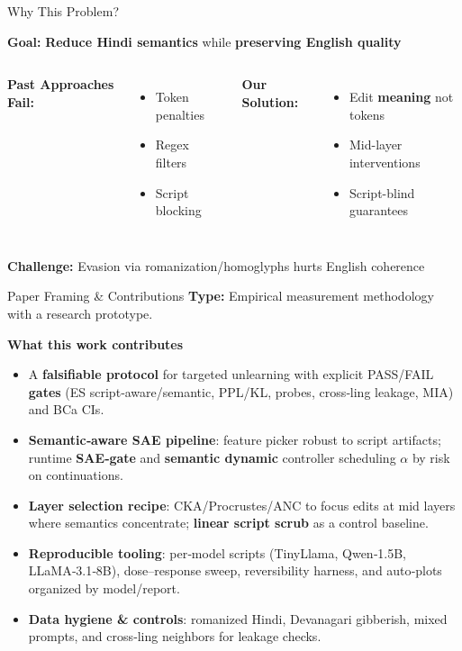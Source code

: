 \documentclass[aspectratio=169]{beamer}
\newcommand{\highlight}[1]{\textcolor{mOrange}{\textbf{#1}}}
\newcommand{\keyword}[1]{\textcolor{mBlue}{\textbf{#1}}}
\newcommand{\success}[1]{\textcolor{mGreen}{\textbf{#1}}}
\begin{document}
\begin{frame}{Why This Problem?}

\textcolor{mBlue}{\textbf{Goal:}} \keyword{Reduce Hindi semantics} while \success{preserving English quality}

\vspace{4mm}

\begin{columns}[T]
\textbf{Past Approaches Fail:}
\begin{itemize}
  \item Token penalties
  \item Regex filters
  \item Script blocking
\end{itemize}

\textbf{Our Solution:}
\begin{itemize}
  \item Edit \highlight{meaning} not tokens
  \item Mid-layer interventions
  \item Script-blind guarantees
\end{itemize}
\end{columns}

\vspace{4mm}

\textcolor{mRed}{\textbf{Challenge:}} Evasion via romanization/homoglyphs hurts English coherence

\end{frame}

\begin{frame}{Paper Framing \& Contributions}
\small
\textbf{Type:} Empirical measurement methodology with a research prototype.

\vspace{2mm}

\textbf{What this work contributes}
\begin{itemize}
  \item A \textbf{falsifiable protocol} for targeted unlearning with explicit
        PASS/FAIL \textbf{gates} (ES script‑aware/semantic, PPL/KL, probes,
        cross‑ling leakage, MIA) and BCa CIs.
  \item \textbf{Semantic‑aware SAE pipeline}: feature picker robust to script
        artifacts; runtime \textbf{SAE‑gate} and \textbf{semantic dynamic}
        controller scheduling $\alpha$ by risk on continuations.
  \item \textbf{Layer selection recipe}: CKA/Procrustes/ANC to focus edits at
        mid layers where semantics concentrate; \textbf{linear script scrub}
        as a control baseline.
  \item \textbf{Reproducible tooling}: per‑model scripts (TinyLlama, Qwen‑1.5B,
        LLaMA‑3.1‑8B), dose–response sweep, reversibility harness, and
        auto‑plots organized by model/report.
  \item \textbf{Data hygiene \& controls}: romanized Hindi, Devanagari
        gibberish, mixed prompts, and cross‑ling neighbors for leakage checks.
\end{itemize}
\end{frame}
\end{document}
